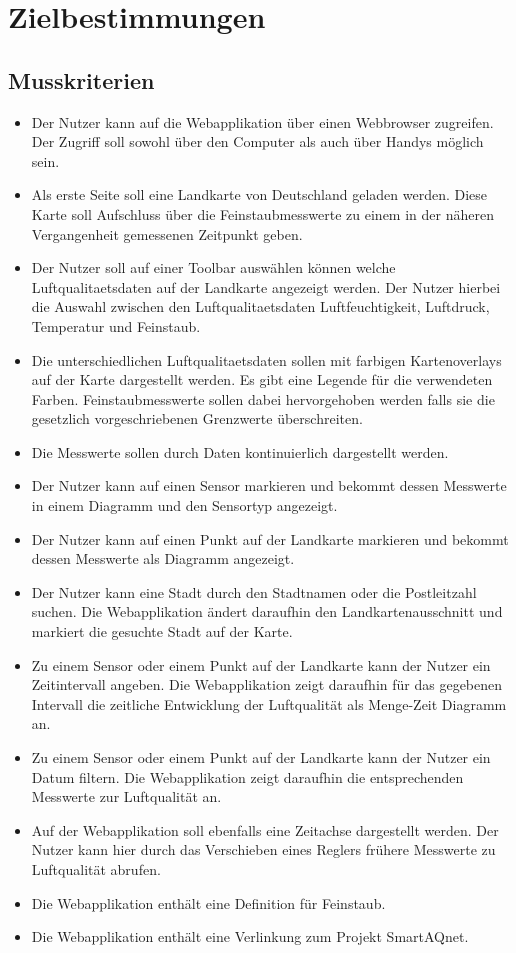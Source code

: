 \section{Zielbestimmungen}
\subsection{Musskriterien}
 \begin{itemize}
	\item Der Nutzer kann auf die Webapplikation über einen Webbrowser zugreifen. 
	Der Zugriff soll sowohl über den Computer als auch über Handys möglich sein.
	\item Als erste Seite soll eine Landkarte von Deutschland geladen werden.
	Diese Karte soll Aufschluss über die \gls{Feinstaub}messwerte zu einem in der näheren Vergangenheit gemessenen Zeitpunkt geben.
	\item Der Nutzer soll auf einer \gls{Toolbar} auswählen können welche \gls{Luftqualitaetsdaten} auf der Landkarte angezeigt werden. 
	Der Nutzer hierbei die Auswahl zwischen den \gls{Luftqualitaetsdaten} Luftfeuchtigkeit, Luftdruck, Temperatur und \gls{Feinstaub}.
	\item Die unterschiedlichen \gls{Luftqualitaetsdaten} sollen mit farbigen \glspl{Kartenoverlay} auf der Karte dargestellt werden. 
	Es gibt eine Legende für die verwendeten Farben. \gls{Feinstaub}messwerte sollen dabei hervorgehoben werden falls sie die gesetzlich vorgeschriebenen Grenzwerte überschreiten.
	\item Die Messwerte sollen durch  Daten kontinuierlich dargestellt werden.
	\item Der Nutzer kann auf einen \gls{Sensor} markieren und bekommt dessen Messwerte in einem Diagramm und den Sensortyp angezeigt.
	\item Der Nutzer kann auf einen Punkt auf der Landkarte markieren und bekommt dessen  Messwerte als Diagramm angezeigt.
	\item Der Nutzer kann eine Stadt durch den Stadtnamen oder die Postleitzahl suchen. 
	Die Webapplikation ändert daraufhin den Landkartenausschnitt und markiert die gesuchte Stadt auf der Karte.
	\item  Zu einem \gls{Sensor} oder einem Punkt auf der Landkarte kann der Nutzer ein Zeitintervall angeben. Die Webapplikation zeigt daraufhin für das gegebenen Intervall 
	die zeitliche Entwicklung der Luftqualität als Menge-Zeit Diagramm an.
	\item Zu einem \gls{Sensor} oder einem Punkt auf der Landkarte kann der Nutzer ein Datum filtern. 
	Die Webapplikation zeigt daraufhin die entsprechenden Messwerte zur Luftqualität an.
	\item Auf der Webapplikation soll ebenfalls eine Zeitachse dargestellt werden. 
	Der Nutzer kann hier durch das Verschieben eines Reglers frühere Messwerte zu Luftqualität abrufen. 
	\item Die Webapplikation enthält eine Definition für \gls{Feinstaub}.
	\item Die Webapplikation enthält eine Verlinkung zum Projekt \gls{SmartAQnet}. 
\end{itemize}
